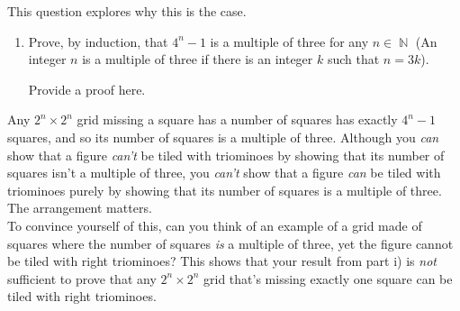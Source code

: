 \documentclass{article}
\renewcommand{\(}{\left(}
\renewcommand{\)}{\right)}
\DeclareMathOperator{\N}{\mathbb{N}}
\theoremstyle{plain}
\theoremstyle{plain}
\theoremstyle{definition}
\begin{document}
\begin{center}
\end{center}

This question explores why this is the case.

\begin{enumerate}[label*=\roman*.,ref=\roman*]
    \item Prove, by induction, that $4^n - 1$ is a multiple of three for any $n \in \N$ (An integer $n$ is a multiple of three if there is an integer $k$ such that $n = 3k$).
    
    \begin{shaded}
    Provide a proof here.
    \end{shaded}
\end{enumerate}

Any $2^n \times 2^n$ grid missing a square has a number of squares has exactly $4^n - 1$ squares, and so its number of squares is a multiple of three. Although you \textit{can} show that a figure \textit{can't} be tiled with triominoes by showing that its number of squares isn't a multiple of three, you \textit{can't} show that a figure \textit{can} be tiled with triominoes purely by showing that its number of squares is a multiple of three. The arrangement matters. \\

To convince yourself of this, can you think of an example of a grid made of squares where the number of squares \textit{is} a multiple of three, yet the figure cannot be tiled with right triominoes? This shows that your result from part i) is \textit{not} sufficient to prove that any $2^n \times 2^n$ grid that's missing exactly one square can be tiled with right triominoes.
\end{document}
